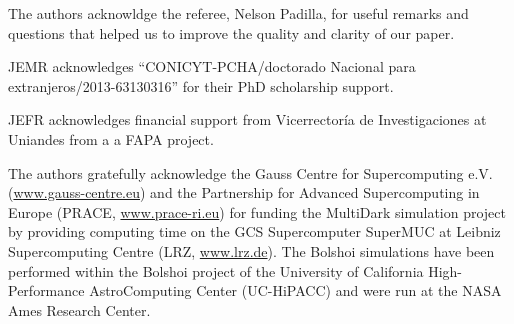 \documentclass{emulateapj}
\begin{document}
The authors acknowldge the referee, Nelson Padilla, for useful
remarks and questions that helped us to improve the quality and
clarity of our paper. 

JEMR acknowledges ``CONICYT-PCHA/doctorado Nacional para
extranjeros/2013-63130316'' for their PhD scholarship support.  

JEFR acknowledges financial support from Vicerrector\'ia de
Investigaciones at Uniandes from a a FAPA project.

The authors gratefully acknowledge the Gauss Centre for Supercomputing
e.V. (\url{www.gauss-centre.eu}) and the Partnership for Advanced
Supercomputing in Europe (PRACE, \url{www.prace-ri.eu}) for funding the
MultiDark simulation project by providing computing time on the GCS
Supercomputer SuperMUC at Leibniz Supercomputing Centre (LRZ,
\url{www.lrz.de}). The Bolshoi simulations have been performed within the
Bolshoi project of the University of California High-Performance
AstroComputing Center (UC-HiPACC) and were run at the NASA Ames
Research Center. 



%
\end{document}
